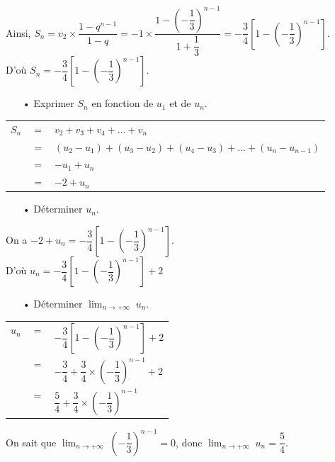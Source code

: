 Ainsi, $S_n = v_2 \times \dfrac{1 - q^{n-1}}{1 - q} = -1\times \dfrac{1-\left(-\dfrac{1}{3}\right)^{n-1}}{1 + \dfrac{1}{3}} = -\dfrac{3}{4}\left[1 - \left(-\dfrac{1}{3}\right)^{n-1}\right]$. \\

D'où $S_n = -\dfrac{3}{4}\left[1 - \left(-\dfrac{1}{3}\right)^{n-1}\right]$. 

\vspace*{.3cm}

\begin{itemize}
\item[•] Exprimer $S_n$ en fonction de $u_1$ et de $u_{n}$. \\
\end{itemize}

\begin{tabular}{lll}
$S_n$ & $ = $ & $ v_2 + v_3 + v_4 + ... + v_n$ \\
& $=$ & $\left(u_2 - u_1\right) + \left(u_3-u_2\right) + \left(u_4 - u_3\right) + ... + \left(u_{n} - u_{n-1}\right)$ \\
& $=$ & $-u_1 + u_{n}$ \\
& $=$ & $-2 + u_{n}$ \\
\end{tabular}

\vspace*{.3cm}

\begin{itemize}
\item[•] Déterminer $u_n$. \\
\end{itemize}

On a $-2 + u_{n} = -\dfrac{3}{4}\left[1 - \left(-\dfrac{1}{3}\right)^{n-1}\right]$. \\

D'où $u_{n} = -\dfrac{3}{4}\left[1 - \left(-\dfrac{1}{3}\right)^{n-1}\right] + 2$ \\

\vspace*{.3cm}

\begin{itemize}
\item[•] Déterminer $ \displaystyle {\lim_{n \rightarrow +\infty}} \; u_n$. \\
\end{itemize}

\vspace*{.3cm}

\begin{tabular}{lll}
$u_n$ & $=$ & $-\dfrac{3}{4}\left[1-\left(-\dfrac{1}{3}\right)^{n-1}\right] + 2$ \vspace*{.3cm} \\
& $=$ & $-\dfrac{3}{4} + \dfrac{3}{4} \times \left(-\dfrac{1}{3}\right)^{n-1} + 2$ \vspace*{.3cm} \\
& $=$ & $\dfrac{5}{4} + \dfrac{3}{4} \times \left(-\dfrac{1}{3}\right)^{n-1}$ \vspace*{.3cm} \\
\end{tabular}

\vspace*{.3cm}

On sait que $ \displaystyle {\lim_{n \rightarrow +\infty}} \; \left(-\dfrac{1}{3}\right)^{n-1} = 0$, donc $ \displaystyle {\lim_{n \rightarrow +\infty}} \; u_n = \dfrac{5}{4}$. \\